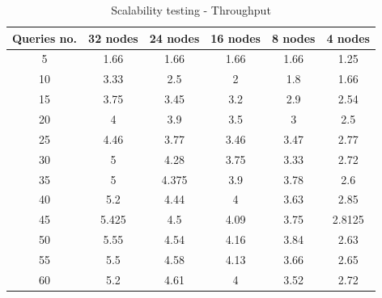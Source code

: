 \begin{table}[H]
\begin{center}
\begin{tabular}{|c|c|c|c|c|c|}
\hline
Queries no. & 32 nodes & 24 nodes & 16 nodes & 8 nodes & 4 nodes \\ \hline
5 & 1.66   & 1.66  & 1.66 & 1.66 & 1.25\\ \hline
10 & 3.33  & 2.5   & 2    & 1.8  & 1.66\\ \hline
15 & 3.75  & 3.45  & 3.2  & 2.9  & 2.54\\ \hline
20 & 4     & 3.9   & 3.5  & 3    & 2.5\\ \hline
25 & 4.46  & 3.77  & 3.46 & 3.47 & 2.77\\ \hline
30 & 5     & 4.28  & 3.75 & 3.33 & 2.72\\ \hline
35 & 5     & 4.375 & 3.9  & 3.78 & 2.6 \\ \hline
40 & 5.2   & 4.44  & 4    & 3.63 & 2.85 \\ \hline
45 & 5.425 & 4.5   & 4.09 & 3.75 & 2.8125 \\ \hline
50 & 5.55  & 4.54  & 4.16 & 3.84 & 2.63 \\ \hline
55 & 5.5   & 4.58  & 4.13 & 3.66 & 2.65 \\ \hline
60 & 5.2   & 4.61  & 4    & 3.52 & 2.72 \\ \hline
\end{tabular}
\end{center}
\caption{Scalability testing - Throughput}
\end{table}

